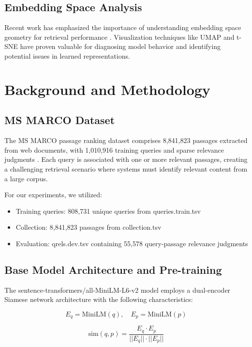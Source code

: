 \documentclass[conference]{IEEEtran}
\begin{document}
\subsection{Embedding Space Analysis}
Recent work has emphasized the importance of understanding embedding space geometry for retrieval performance \cite{reimers2019sentence}. Visualization techniques like UMAP \cite{mcinnes2018umap} and t-SNE \cite{maaten2008visualizing} have proven valuable for diagnosing model behavior and identifying potential issues in learned representations.

\section{Background and Methodology}
\subsection{MS MARCO Dataset}
The MS MARCO passage ranking dataset comprises 8,841,823 passages extracted from web documents, with 1,010,916 training queries and sparse relevance judgments \cite{msmarco}. Each query is associated with one or more relevant passages, creating a challenging retrieval scenario where systems must identify relevant content from a large corpus.

For our experiments, we utilized:
\begin{itemize}
\item Training queries: 808,731 unique queries from queries.train.tsv
\item Collection: 8,841,823 passages from collection.tsv
\item Evaluation: qrels.dev.tsv containing 55,578 query-passage relevance judgments
\end{itemize}

\subsection{Base Model Architecture and Pre-training}
The sentence-transformers/all-MiniLM-L6-v2 model employs a dual-encoder Siamese network architecture \cite{dong2022exploring} with the following characteristics:

\begin{equation}
E_q = \text{MiniLM}(q), \quad E_p = \text{MiniLM}(p)
\end{equation}

\begin{equation}
\text{sim}(q,p) = \frac{E_q \cdot E_p}{||E_q|| \cdot ||E_p||}
\end{equation}
\end{document}
